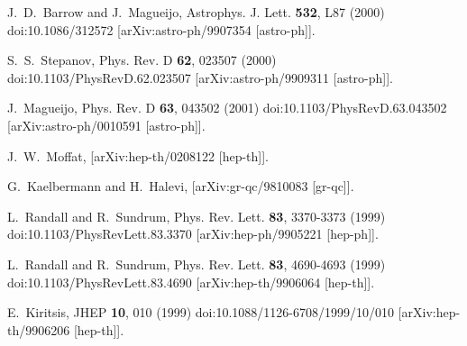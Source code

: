 \documentclass[jkps,preprint,fleqn]{revtex4} %
\begin{document}
\begin{thebibliography}{999}
J.~D.~Barrow and J.~Magueijo,
Astrophys. J. Lett. \textbf{532}, L87 (2000)
doi:10.1086/312572
[arXiv:astro-ph/9907354 [astro-ph]].

S.~S.~Stepanov,
Phys. Rev. D \textbf{62}, 023507 (2000)
doi:10.1103/PhysRevD.62.023507
[arXiv:astro-ph/9909311 [astro-ph]].

J.~Magueijo,
Phys. Rev. D \textbf{63}, 043502 (2001)
doi:10.1103/PhysRevD.63.043502
[arXiv:astro-ph/0010591 [astro-ph]].

J.~W.~Moffat,
[arXiv:hep-th/0208122 [hep-th]].



G.~Kaelbermann and H.~Halevi,
[arXiv:gr-qc/9810083 [gr-qc]].

L.~Randall and R.~Sundrum,
Phys. Rev. Lett. \textbf{83}, 3370-3373 (1999)
doi:10.1103/PhysRevLett.83.3370
[arXiv:hep-ph/9905221 [hep-ph]].

L.~Randall and R.~Sundrum,
Phys. Rev. Lett. \textbf{83}, 4690-4693 (1999)
doi:10.1103/PhysRevLett.83.4690
[arXiv:hep-th/9906064 [hep-th]].

E.~Kiritsis,
JHEP \textbf{10}, 010 (1999)
doi:10.1088/1126-6708/1999/10/010
[arXiv:hep-th/9906206 [hep-th]].


\end{thebibliography}
\end{document}
